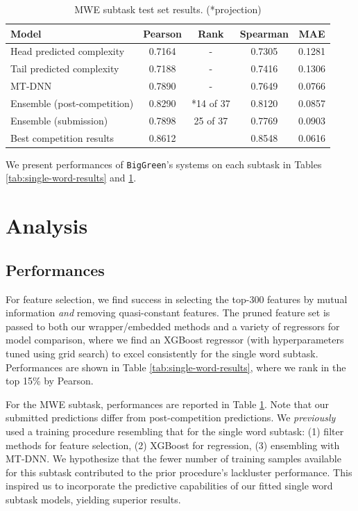 \documentclass{dcthesis}
\theoremstyle{definition}
\theoremstyle{remark}
\begin{document}
\begin{table}[t]
  \centering
  \begin{tabular}{lcccc}
  \hline \textbf{Model} & \textbf{Pearson} & \textbf{Rank} & \textbf{Spearman} & \textbf{MAE} \\ \hline
  Head predicted complexity & 0.7164 & - & 0.7305 & 0.1281 \\
  Tail predicted complexity & 0.7188 & - & 0.7416 & 0.1306 \\
  MT-DNN & 0.7890 & - & 0.7649 & 0.0766 \\
  Ensemble (post-competition) & 0.8290 & *14 of 37 & 0.8120 & 0.0857 \\
  Ensemble (submission) & 0.7898 & 25 of 37 & 0.7769 & 0.0903 \\
  \hline
  Best competition results & 0.8612 & &  0.8548 & 0.0616 \\ 
  \hline
  \end{tabular}
  \caption{\label{tab:multi-word-results} MWE subtask test set results. (*projection)}
\end{table}

We present performances of \texttt{BigGreen}'s systems on each subtask in Tables \ref{tab:single-word-results} and \ref{tab:multi-word-results}.

\chapter{Analysis}

\section{Performances}

For feature selection, we find success in selecting the top-300 features by mutual information \textit{and} removing quasi-constant features. The pruned feature set is passed to both our wrapper/embedded methods and a variety of regressors for model comparison, where we find an XGBoost regressor \citep{DBLP:journals/corr/ChenG16} (with hyperparameters tuned using grid search) to excel consistently for the single word subtask. Performances are shown in Table \ref{tab:single-word-results}, where we rank in the top 15\% by Pearson. 

For the MWE subtask, performances are reported in Table \ref{tab:multi-word-results}. Note that our submitted predictions differ from post-competition predictions. We \textit{previously} used a training procedure resembling that for the single word subtask: (1) filter methods for feature selection, (2) XGBoost for regression, (3) ensembling with MT-DNN. We hypothesize that the fewer number of training samples available for this subtask contributed to the prior procedure's lackluster performance. This inspired us to incorporate the predictive capabilities of our fitted single word subtask models, yielding superior results.
\end{document}
